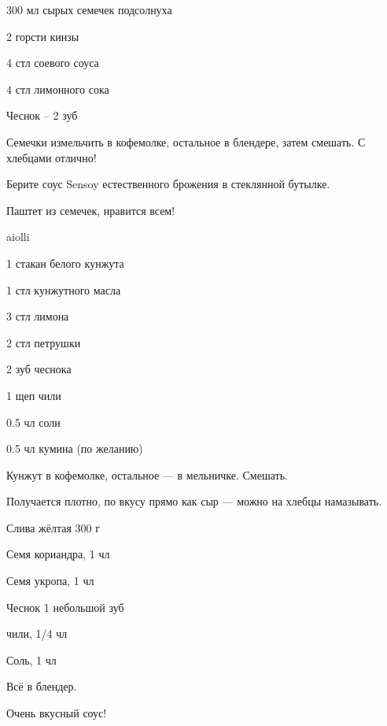 \newpage
\pagestyle{empty}
{}
\titleZD
\newpage
\pagestyle{chap}

{\label{aiolli}
\item 300 мл сырых семечек подсолнуха
\item 2 горсти кинзы 
\item 4 стл соевого соуса
\item 4 стл лимонного сока
}{
\item Чеснок – 2 зуб
}{
Семечки измельчить в кофемолке, остальное в блендере, затем смешать. С хлебцами отлично!
}{
\begin{advice}
\item Берите соус Sensoy естественного брожения в стеклянной бутылке.
\item Паштет из семечек, нравится всем!
\end{advice}}{aiolli}



{\label{takini}
\item 1 стакан белого кунжута 
\item 1 стл кунжутного масла
\item 3 стл лимона
\item 2 стл петрушки
}{
\item 2 зуб чеснока
\item 1 щеп чили
\item 0.5 чл соли
\item 0.5 чл кумина (по желанию)
}{
Кунжут в кофемолке, остальное — в мельничке. Смешать. 
}{
\begin{advice}
\item Получается плотно, по вкусу прямо как сыр — можно на хлебцы намазывать.
\end{advice}}{}



{
\item Слива жёлтая 300 г
}{
\item Семя кориандра, 1 чл
\item Семя укропа, 1 чл
\item Чеснок 1 небольшой зуб
\item чили, 1/4 чл
\item Соль, 1 чл
}{
Всё в блендер.  
}{
\begin{advice}
\item Очень вкусный соус! 
\end{advice}}{}



